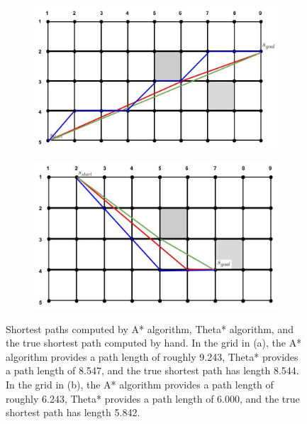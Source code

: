 \documentclass[12pt]{article}
\begin{document}
\begin{enumerate}[label=(\alph*)]
    \begin{figure}
        \begin{subfigure}{0.47\textwidth}
            \centering
            \includegraphics[width=\textwidth]{homework1/images/drawndiagrams/prob1j/prob1ja.jpg}
            \label{fig:prob1ja}
        \end{subfigure}
        \begin{subfigure}{0.46\textwidth}
            \centering
            \includegraphics[width=\textwidth]{homework1/images/drawndiagrams/prob1j/prob1jb.jpg}
            \label{fig:prob1jb}
        \end{subfigure}
        \caption{Shortest paths computed by A* algorithm, Theta* algorithm, and the true shortest path computed by hand. In the grid in (a), the A* algorithm provides a path length of roughly 9.243, Theta* provides a path length of 8.547, and the true shortest path has length 8.544. In the grid in (b), the A* algorithm provides a path length of roughly 6.243, Theta* provides a path length of 6.000, and the true shortest path has length 5.842.}
    \end{figure}


\end{enumerate}
\end{document}
